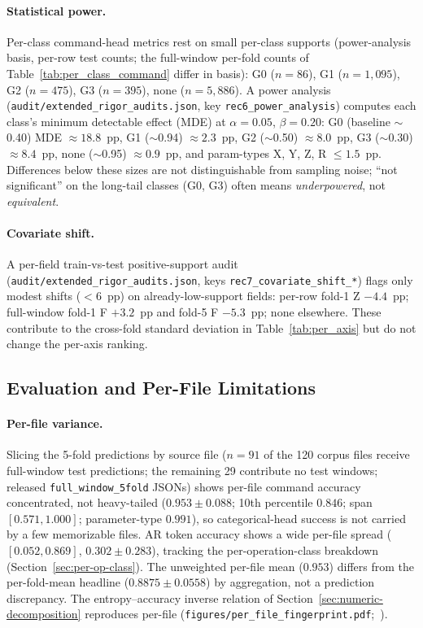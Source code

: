 \documentclass[sensors,article,submit,moreauthors,pdftex]{Definitions/mdpi}
\begin{document}
\paragraph{Statistical power.}\label{sec:lim-power} Per-class command-head metrics rest on small per-class supports (power-analysis basis, per-row test counts; the full-window per-fold counts of Table~\ref{tab:per_class_command} differ in basis): G0 ($n\!=\!86$), G1 ($n\!=\!1{,}095$), G2 ($n\!=\!475$), G3 ($n\!=\!395$), none ($n\!=\!5{,}886$). A power analysis (\texttt{audit/extended\_rigor\_audits.json}, key \texttt{rec6\_power\_analysis}) computes each class's minimum detectable effect (MDE) at $\alpha\!=\!0.05$, $\beta\!=\!0.20$: G0 (baseline $\sim$0.40) MDE $\approx 18.8$~pp, G1 ($\sim$0.94) $\approx 2.3$~pp, G2 ($\sim$0.50) $\approx 8.0$~pp, G3 ($\sim$0.30) $\approx 8.4$~pp, none ($\sim$0.95) $\approx 0.9$~pp, and param-types X, Y, Z, R $\le 1.5$~pp. Differences below these sizes are not distinguishable from sampling noise; ``not significant'' on the long-tail classes (G0, G3) often means \emph{underpowered}, not \emph{equivalent}.

\paragraph{Covariate shift.}\label{sec:lim-covariate} A per-field train-vs-test positive-support audit (\texttt{audit/extended\_rigor\_audits.json}, keys \texttt{rec7\_covariate\_shift\_*}) flags only modest shifts ($<\!6$~pp) on already-low-support fields: per-row fold-1 Z $-4.4$~pp; full-window fold-1 F $+3.2$~pp and fold-5 F $-5.3$~pp; none elsewhere. These contribute to the cross-fold standard deviation in Table~\ref{tab:per_axis} but do not change the per-axis ranking.

\subsection{Evaluation and Per-File Limitations}
\label{sec:lim-eval}

\paragraph{Per-file variance.}\label{sec:lim-per-file} Slicing the 5-fold predictions by source file ($n=91$ of the 120 corpus files receive full-window test predictions; the remaining 29 contribute no test windows; released \texttt{full\_window\_5fold} JSONs) shows per-file command accuracy concentrated, not heavy-tailed ($0.953 \pm 0.088$; 10th percentile $0.846$; span $[0.571, 1.000]$; parameter-type $0.991$), so categorical-head success is not carried by a few memorizable files. AR token accuracy shows a wide per-file spread ($[0.052, 0.869]$, $0.302 \pm 0.283$), tracking the per-operation-class breakdown (Section~\ref{sec:per-op-class}). The unweighted per-file mean ($0.953$) differs from the per-fold-mean headline ($0.8875 \pm 0.0558$) by aggregation, not a prediction discrepancy. The entropy--accuracy inverse relation of Section~\ref{sec:numeric-decomposition} reproduces per-file (\texttt{figures/per\_file\_fingerprint.pdf};~\cite{paperB_entropy}).
\end{document}
